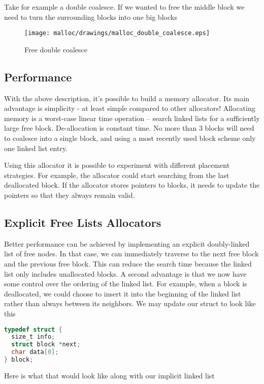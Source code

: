 Take for example a double coalesce.
If we wanted to free the middle block we need to turn the surrounding blocks into one big blocks

\begin{figure}[H]
\centering
\texttt{[image: malloc/drawings/malloc\_double\_coalesce.eps]}
\caption{Free double coalesce}
\end{figure}

\subsection{Performance}

With the above description, it's possible to build a memory allocator.
Its main advantage is simplicity - at least simple compared to other allocators!
Allocating memory is a worst-case linear time operation -- search linked lists for a sufficiently large free block.
De-allocation is constant time.
No more than 3 blocks will need to coalesce into a single block, and using a most recently used block scheme only one linked list entry.

Using this allocator it is possible to experiment with different placement strategies.
For example, the allocator could start searching from the last deallocated block.
If the allocator stores pointers to blocks, it needs to update the pointers so that they always remain valid.

\subsection{Explicit Free Lists Allocators}

Better performance can be achieved by implementing an explicit doubly-linked list of free nodes.
In that case, we can immediately traverse to the next free block and the previous free block.
This can reduce the search time because the linked list only includes unallocated blocks.
A second advantage is that we now have some control over the ordering of the linked list.
For example, when a block is deallocated, we could choose to insert it into the beginning of the linked list rather than always between its neighbors.
We may update our struct to look like this

\begin{lstlisting}[language=C]
typedef struct {
  size_t info;
  struct block *next;
  char data[0];
} block;
\end{lstlisting}

Here is what that would look like along with our implicit linked list

